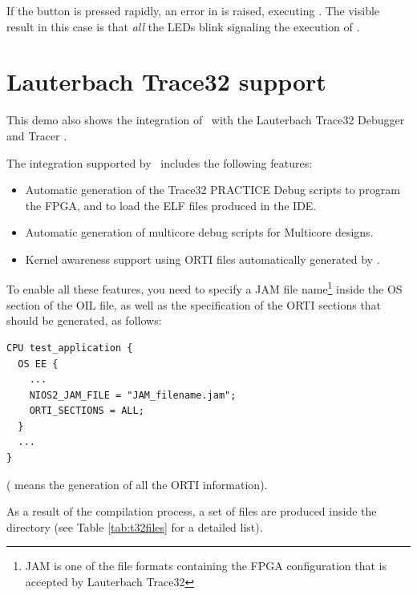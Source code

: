 If the button is pressed rapidly, an error in  is
raised, executing . The visible result in this case is
that {\em all} the LEDs blink signaling the execution of
.






\section{Lauterbach Trace32 support}

This demo also shows the integration of \ee\ with the Lauterbach
Trace32 Debugger and Tracer \cite{Lauterbach}.

The integration supported by \ee\ includes the following features:
\begin{itemize}
\item Automatic generation of the Trace32 PRACTICE Debug scripts to
  program the FPGA, and to load the ELF files produced in the IDE.
\item Automatic generation of multicore debug scripts for
  Multicore designs.
\item Kernel awareness support using ORTI files automatically
  generated by \rtd. 
\end{itemize}

To enable all these features, you need to specify a JAM file
name\footnote{JAM is one of the file formats containing the FPGA
  configuration that is accepted by Lauterbach Trace32} inside the OS
section of the OIL file, as well as the specification of the ORTI
sections that should be generated, as follows:

\begin{lstlisting}
CPU test_application {
  OS EE {
    ...
    NIOS2_JAM_FILE = "JAM_filename.jam";
    ORTI_SECTIONS = ALL;
  }
  ...
}
\end{lstlisting}
( means the generation of all the ORTI information).

As a result of the compilation process, a set of files are produced
inside the  directory (see Table \ref{tab:t32files} for a
detailed list).

